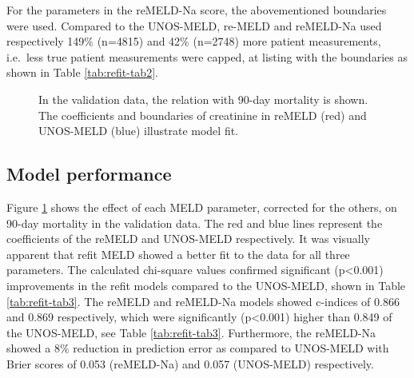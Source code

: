 \documentclass[11pt,english,]{book} %
\begin{document}
For the parameters in the reMELD-Na score, the abovementioned boundaries were used. Compared to the UNOS-MELD, re-MELD and reMELD-Na used respectively 149\% (n=4815) and 42\% (n=2748) more patient measurements, i.e.~less true patient measurements were capped, at listing with the boundaries as shown in Table \ref{tab:refit-tab2}.

\begin{figure}

{\centering {}\newline{}\newline{}

}

\caption{In the validation data, the relation with 90-day mortality is shown. The coefficients and boundaries of creatinine in reMELD (red) and UNOS-MELD (blue) illustrate model fit.}\label{fig:refit-fig3}
\end{figure}

\hypertarget{model-performance}{%
\subsection*{Model performance}\label{model-performance}}

Figure \ref{fig:refit-fig3} shows the effect of each MELD parameter, corrected for the others, on 90-day mortality in the validation data. The red and blue lines represent the coefficients of the reMELD and UNOS-MELD respectively. It was visually apparent that refit MELD showed a better fit to the data for all three parameters. The calculated chi-square values confirmed significant (p\textless0.001) improvements in the refit models compared to the UNOS-MELD, shown in Table \ref{tab:refit-tab3}. The reMELD and reMELD-Na models showed c-indices of 0.866 and 0.869 respectively, which were significantly (p\textless0.001) higher than 0.849 of the UNOS-MELD, see Table \ref{tab:refit-tab3}. Furthermore, the reMELD-Na showed a 8\% reduction in prediction error as compared to UNOS-MELD with Brier scores of 0.053 (reMELD-Na) and 0.057 (UNOS-MELD) respectively.
\end{document}
